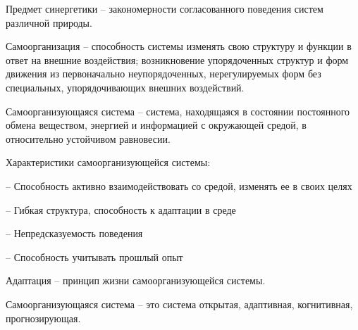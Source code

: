 \documentclass[exam_answers.tex]{subfiles}
\begin{document}
\renewcommand{\baselinestretch}{\blch}

Предмет синергетики -- закономерности согласованного поведения систем различной природы.

Самоорганизация -- способность системы изменять свою структуру и функции в ответ на
внешние воздействия; возникновение упорядоченных структур и форм движения из
первоначально неупорядоченных, нерегулируемых форм без
специальных, упорядочивающих внешних воздействий.

Самоорганизующаяся система -- система, находящаяся в состоянии
постоянного обмена веществом, энергией и информацией с
окружающей средой, в относительно устойчивом равновесии.

Характеристики самоорганизующейся системы:

-- Способность активно взаимодействовать со средой, изменять ее в
своих целях

-- Гибкая структура, способность к адаптации в среде

-- Непредсказуемость поведения

-- Способность учитывать прошлый опыт

Адаптация -- принцип жизни самоорганизующейся системы.

Самоорганизующаяся система – это система открытая, адаптивная, когнитивная, прогнозирующая.
\end{document}
